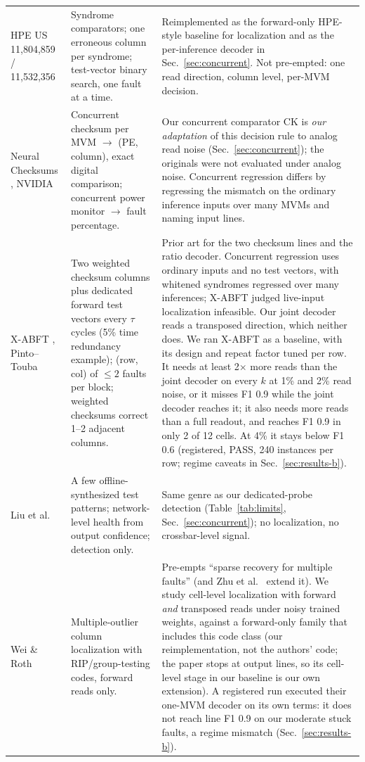 \documentclass[journal]{IEEEtran}
\begin{document}
\begin{table}[t]
\begin{tabular}{p{2.6cm}p{5.3cm}p{8.6cm}}
HPE US 11,804,859 / 11,532,356 \cite{hpe11804859,hpe11532356} & Syndrome comparators; one erroneous column per syndrome; test-vector binary search, one fault at a time. &
Reimplemented as the forward-only HPE-style baseline for localization and as the per-inference decoder in Sec.~\ref{sec:concurrent}. Not pre-empted: one read direction, column level, per-MVM decision. \\
Neural Checksums \cite{neuralchecksums2024}, NVIDIA \cite{nvidia11971790} & Concurrent checksum per MVM $\to$ (PE, column), exact digital comparison; concurrent power monitor $\to$ fault percentage. &
Our concurrent comparator CK is \emph{our adaptation} of this decision rule to analog read noise (Sec.~\ref{sec:concurrent}); the originals were not evaluated under analog noise. Concurrent regression differs by regressing the mismatch on the ordinary inference inputs over many MVMs and naming input lines. \\
X-ABFT \cite{liu2020xabft}, Pinto--Touba \cite{pinto2024touba} & Two weighted checksum columns plus dedicated forward test vectors every $\tau$ cycles (5\% time redundancy example); (row, col) of $\le2$ faults per block; weighted checksums correct 1--2 adjacent columns. &
Prior art for the two checksum lines and the ratio decoder. Concurrent regression uses ordinary inputs and no test vectors, with whitened syndromes regressed over many inferences; X-ABFT judged live-input localization infeasible. Our joint decoder reads a transposed direction, which neither does. We ran X-ABFT as a baseline, with its design and repeat factor tuned per row. It needs at least 2$\times$ more reads than the joint decoder on every $k$ at 1\% and 2\% read noise, or it misses F1 0.9 while the joint decoder reaches it; it also needs more reads than a full readout, and reaches F1 0.9 in only 2 of 12 cells. At 4\% it stays below F1 0.6 (registered, PASS, 240 instances per row; regime caveats in Sec.~\ref{sec:results-b}).
\\
Liu et al.\ \cite{liu2020dac} & A few offline-synthesized test patterns; network-level health from output confidence; detection only. & Same genre as our dedicated-probe detection (Table~\ref{tab:limits}, Sec.~\ref{sec:concurrent}); no localization, no crossbar-level signal. \\
Wei \& Roth \cite{weiroth2024} & Multiple-outlier column localization with RIP/group-testing codes, forward reads only. &
Pre-empts ``sparse recovery for multiple faults'' (and Zhu et al.\ \cite{zhu2026geo} extend it). We study cell-level localization with forward \emph{and} transposed reads under noisy trained weights, against a forward-only family that includes this code class (our reimplementation, not the authors' code; the paper stops at output lines, so its cell-level stage in our baseline is our own extension). A registered run executed their one-MVM decoder on its own terms: it does not reach line F1 0.9 on our moderate stuck faults, a regime mismatch (Sec.~\ref{sec:results-b}).

\end{tabular}
\end{table}
\end{document}
